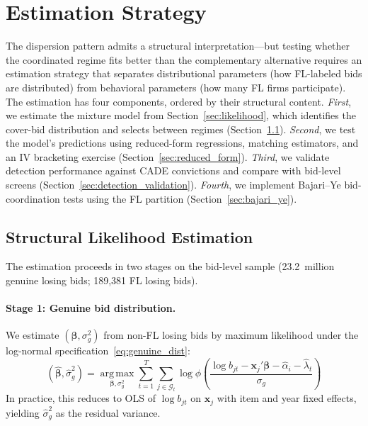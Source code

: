 
\section{Estimation Strategy}
\label{sec:empirical}

The dispersion pattern admits a structural interpretation---but
testing whether the coordinated regime fits better than the
complementary alternative requires an estimation strategy that
separates distributional parameters (how FL-labeled bids are
distributed) from behavioral parameters (how many FL firms
participate). The estimation has four
components, ordered by their structural content.
\emph{First}, we estimate the mixture model from
Section~\ref{sec:likelihood}, which identifies the cover-bid
distribution and selects between regimes
(Section~\ref{sec:structural_estimation}). \emph{Second}, we test
the model's predictions using reduced-form regressions, matching
estimators, and an IV bracketing exercise
(Section~\ref{sec:reduced_form}). \emph{Third}, we validate detection
performance against CADE convictions and compare with bid-level
screens (Section~\ref{sec:detection_validation}). \emph{Fourth}, we
implement Bajari--Ye bid-coordination tests using the FL partition
(Section~\ref{sec:bajari_ye}).


\subsection{Structural Likelihood Estimation}
\label{sec:structural_estimation}

The estimation proceeds in two stages on the bid-level sample
(23.2~million genuine losing bids; 189,381 FL losing bids).

\paragraph{Stage 1: Genuine bid distribution.}
We estimate $(\boldsymbol{\beta}, \sigma_g^2)$ from non-FL losing bids
by maximum likelihood under the log-normal
specification~\eqref{eq:genuine_dist}:
\begin{equation}
  (\hat{\boldsymbol{\beta}}, \hat{\sigma}_g^2) =
  \operatorname*{arg\,max}_{\boldsymbol{\beta}, \sigma_g^2}
  \sum_{t=1}^{T} \sum_{j \in \mathcal{G}_t}
  \log \phi\!\left(
    \frac{\log b_{jt} - \mathbf{x}_j'\boldsymbol{\beta}
    - \hat{\alpha}_i - \hat{\lambda}_t}{\sigma_g}
  \right)
  \label{eq:mle_genuine}
\end{equation}
In practice, this reduces to OLS of $\log b_{jt}$ on $\mathbf{x}_j$
with item and year fixed effects, yielding $\hat{\sigma}_g^2$ as the
residual variance.

